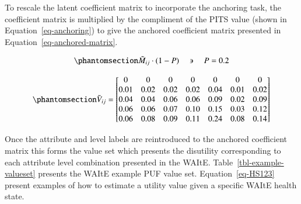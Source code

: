 \documentclass[
  number,
  preprint]{elsarticle}
\begin{document}
To rescale the latent coefficient matrix to incorporate the anchoring
task, the coefficient matrix is multiplied by the compliment of the PITS
value (shown in Equation~\ref{eq-anchoring}) to give the anchored
coefficient matrix presented in Equation~\ref{eq-anchored-matrix}.

\begin{equation}\phantomsection\label{eq-anchoring}{
    \tilde{M}_{ij} \cdot (1-P) \quad \backepsilon \quad P = 0.2 
}\end{equation}

\begin{equation}\phantomsection\label{eq-anchored-matrix}{
\tilde{V}_{ij} =  
\begin{bmatrix}
0 & 0 & 0 & 0 & 0 & 0 & 0 \\
0.01 & 0.02 & 0.02 & 0.02 & 0.04 & 0.01 & 0.02 \\
0.04 & 0.04 & 0.06 & 0.06 & 0.09 & 0.02 & 0.09 \\
0.06 & 0.06 & 0.07 & 0.10 & 0.15 & 0.03 & 0.12 \\
0.06 & 0.08 & 0.09 & 0.11 & 0.24 & 0.08 & 0.14 \\
\end{bmatrix}
}\end{equation}

Once the attribute and level labels are reintroduced to the anchored
coefficient matrix this forms the value set which presents the
disutility corresponding to each attribute level combination presented
in the WAItE. Table~\ref{tbl-example-valueset} presents the WAItE
example PUF value set. Equation~\ref{eq-HS123} present examples of how
to estimate a utility value given a specific WAItE health state.
\end{document}
